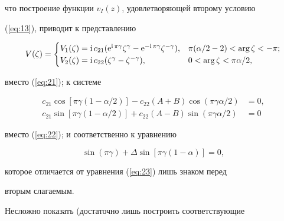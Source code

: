что построение функции $v_I(z)$, удовлетворяющей второму условию


(\ref{eq:13}), приводит к представлению


\begin{equation} 


V(\zeta)=\begin{cases}


V_1(\zeta)=\i c_{21}(\mathrm e^{\i\pi\gamma}


\zeta^\gamma-\mathrm e^{-\i\pi\gamma}\zeta^{-\gamma}), &


\pi(\alpha/2-2)<\arg\zeta<-\pi;\\


V_2(\zeta)=\i c_{22}(\zeta^\gamma-\zeta^{-\gamma}), &


0<\arg\zeta<\pi\alpha/2,\end{cases}


\label{eq:24}


\end{equation}


вместо (\ref{eq:21}); к системе


\begin{equation}


\begin{split}


c_{21}\cos[\pi\gamma(1-\alpha/2)]-c_{22}(A+B)\cos(\pi\gamma\alpha/2)&=0,\\


c_{21}\sin[\pi\gamma(1-\alpha/2)]+c_{22}(A-B)\sin(\pi\gamma\alpha/2)&=0


\end{split}


\label{eq:25}


\end{equation}


вместо (\ref{eq:22}); и соответственно к уравнению


\begin{equation} 


\sin(\pi\gamma)+\Delta\sin [\pi\gamma(1-\alpha)]=0,


\label{eq:26}


\end{equation}


которое отличается от уравнения (\ref{eq:23}) лишь знаком перед


вторым слагаемым.





Несложно показать (достаточно лишь построить соответствующие


